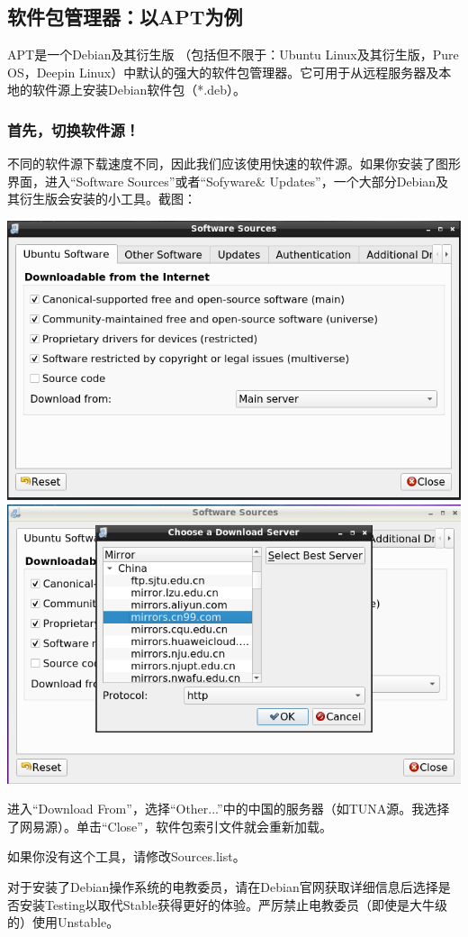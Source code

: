 \subsection{软件包管理器：以APT为例}
\label{sec:apt}APT是一个Debian及其衍生版 （包括但不限于：Ubuntu Linux及其衍生版，Pure OS，Deepin Linux）中默认的强大的软件包管理器。它可用于从远程服务器及本地的软件源上安装Debian软件包（*.deb）。
\subsubsection{首先，切换软件源！}
不同的软件源下载速度不同，因此我们应该使用快速的软件源。如果你安装了图形界面，进入“Software Sources”或者“Sofyware\& Updates”，一个大部分Debian及其衍生版会安装的小工具。截图：
\begin{center}
	\includegraphics[scale=0.4]{pic/src1}	\includegraphics[scale=0.4]{pic/src2}
\end{center} \par
进入“Download From”，选择“Other...”中的中国的服务器（如TUNA源。我选择了网易源）。单击“Close”，软件包索引文件就会重新加载。\par
如果你没有这个工具，请修改Sources.list。\par
对于安装了Debian操作系统的电教委员，请在Debian官网获取详细信息后选择是否安装Testing以取代Stable获得更好的体验。严厉禁止电教委员（即使是大牛级的）使用Unstable。
